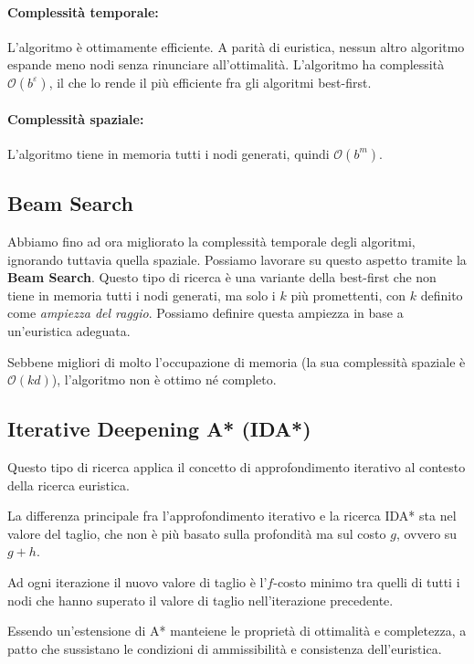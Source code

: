         \paragraph{Complessità temporale:} L'algoritmo è ottimamente efficiente. A parità di euristica, nessun altro algoritmo espande meno nodi senza rinunciare all'ottimalità. L'algoritmo ha complessità $\mathcal{O}(b^\varepsilon)$, il che lo rende il più efficiente fra gli algoritmi best-first.
        
        \paragraph{Complessità spaziale:} L'algoritmo tiene in memoria tutti i nodi generati, quindi $\mathcal{O}(b^m)$.
        
    \subsection{Beam Search}
        Abbiamo fino ad ora migliorato la complessità temporale degli algoritmi, ignorando tuttavia quella spaziale. Possiamo lavorare su questo aspetto tramite la \textbf{Beam Search}. Questo tipo di ricerca è una variante della best-first che non tiene in memoria tutti i nodi generati, ma solo i $k$ più promettenti, con $k$ definito come \textit{ampiezza del raggio}. Possiamo definire questa ampiezza in base a un'euristica adeguata.
        
        Sebbene migliori di molto l'occupazione di memoria (la sua complessità spaziale è $\mathcal{O}(kd)$), l'algoritmo non è ottimo né completo.
        
    \subsection{Iterative Deepening A* (IDA*)}
        Questo tipo di ricerca applica il concetto di approfondimento iterativo al contesto della ricerca euristica. 
        
        La differenza principale fra l'approfondimento iterativo e la ricerca IDA* sta nel valore del taglio, che non è più basato sulla profondità ma sul costo $g$, ovvero su $g+h$.
        
        Ad ogni iterazione il nuovo valore di taglio è l'$f$-costo minimo tra quelli di tutti i nodi che hanno superato il valore di taglio nell'iterazione precedente.
        
        Essendo un'estensione di A* manteiene le proprietà di ottimalità e completezza, a patto che sussistano le condizioni di ammissibilità e consistenza dell'euristica.
        
